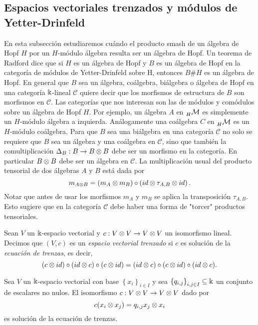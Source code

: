 \documentclass[a4paper,oneside,fleqn,11pt,../tesis.tex]{subfiles}
\begin{document}
\subsection{Espacios vectoriales trenzados y módulos de Yetter-Drinfeld}

En esta subsección estudiaremos cuándo el producto smash de un álgebra de Hopf $H$
por un $H$-módulo álgebra resulta ser un álgebra de Hopf.
Un teorema de Radford \cite{Ra} dice que si $H$ es un álgebra de Hopf y $B$ es un 
álgebra de Hopf en la categoría de módulos de Yetter-Drinfeld sobre H, entonces $B\#H$ es un álgebra
de Hopf. En general que $B$ sea un álgebra, coálgebra, biálgebra o álgebra de Hopf en una categoría $\Bbbk$-lineal $\mathcal{C}$
quiere decir que los morfismos de estructura de $B$ son morfismos en $\mathcal{C}$. Las categorías que nos interesan
son las de módulos y comódulos sobre un álgebra de Hopf $H$. Por ejemplo, un álgebra $A$ en $\prescript{}{H}{\mathcal{M}}$
es simplemente un $H$-módulo álgebra a izquierda. Análogamente una coálgebra $C$ en $\prescript{}{H}{\mathcal{M}}$
es un $H$-módulo coálgebra. Para que $B$ sea una biálgebra en una categoría $\mathcal{C}$ no solo se requiere que $B$ sea
un álgebra y una coálgebra en $\mathcal{C}$, sino que también la comultiplicación $\Delta_B:B \to B\otimes B$ debe ser un morfismo en la categoría.
En particular $B\otimes B$ debe ser un álgebra en $\mathcal{C}$. La multiplicación usual del producto tensorial de dos álgebras
$A$ y $B$ está dada por 
\[
	m_{A\otimes B} = \left(m_A \otimes m_B\right) \circ \left(id \otimes \tau_{A, B} \otimes id\right).
\]
Notar que antes de usar los morfismos $m_A$ y $m_B$ se aplica la transposición $\tau_{A, B}$. Esto sugiere
que en la categoría $\mathcal{C}$ debe haber una forma de "torcer" productos tensoriales.

\begin{definition}
	Sean $V$ un $\Bbbk$-espacio vectorial y $c:V \otimes V \to V \otimes V$ un isomorfismo lineal. Decimos
	que $(V,c)$ es un \emph{espacio vectorial trenzado} si $c$ es solución de la \emph{ecuación de trenzas}, es decir,
	\[
		(c \otimes id)\circ(id \otimes c)\circ(c \otimes id) = (id \otimes c)\circ(c \otimes id)\circ(id \otimes c).
	\] 
\end{definition}

\begin{example}
	Sea $V$ un $\Bbbk$-espacio vectorial con base $\left\lbrace x_i \right\rbrace_{i \in I}$
	y sea $\left\lbrace q_{i, j} \right\rbrace_{i, j \in I} \subseteq \Bbbk$ un conjunto de escalares no nulos.
	El isomorfismo $c:V \otimes V \to V \otimes V$ dado por
	\[
		c(x_i \otimes x_j) = q_{i, j} x_j \otimes x_i
	\] es solución de la ecuación de trenzas.
\end{example}
\end{document}
